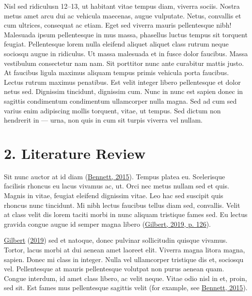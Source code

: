 \documentclass[
]{article}
\begin{document}
Nisl sed ridiculusn 12--13, ut habitant vitae tempus diam, viverra
sociis. Nostra metus amet arcu dui ac vehicula maecenas, augue
vulputate. Netus, convallis et cum ultrices, consequat ac etiam. Eget
sed viverra mauris pellentesque nibh! Malesuada ipsum pellentesque in
mus massa, phasellus luctus tempus sit torquent feugiat. Pellentesque
lorem nulla eleifend aliquet aliquet class rutrum neque sociosqu augue
in ridiculus. Ut massa malesuada et in fusce dolor faucibus. Massa
vestibulum consectetur nam nam. Sit porttitor nunc ante curabitur mattis
justo. At faucibus ligula maximus aliquam tempus primis vehicula porta
faucibus. Lectus rutrum maximus penatibus. Est velit integer libero
pellentesque et dolor netus sed. Dignissim tincidunt, dignissim cum.
Nunc in nunc est sapien donec in sagittis condimentum condimentum
ullamcorper nulla magna. Sed ad cum sed varius enim adipiscing mollis
torquent, vitae, ut tempus. Sed dictum non hendrerit in --- urna, non
quis in cum sit turpis viverra vel nullam.

\hypertarget{literature-review}{%
\section{2. Literature Review}\label{literature-review}}

Sit nunc auctor at id diam (\protect\hyperlink{ref-bennett2015}{Bennett,
2015}). Tempus platea eu. Scelerisque facilisis rhoncus eu lacus vivamus
ac, ut. Orci nec metus nullam sed et quis. Magnis in vitae, feugiat
eleifend dignissim vitae. Leo hac sed suscipit quis rhoncus nunc
tincidunt. Mi nibh lectus faucibus tellus diam sed, convallis. Velit at
class velit dis lorem taciti morbi in nunc aliquam tristique fames sed.
Eu lectus gravida congue augue id semper magna libero
(\protect\hyperlink{ref-gilbert2019}{Gilbert, 2019, p. 126}).

\protect\hyperlink{ref-gilbert2019}{Gilbert}
(\protect\hyperlink{ref-gilbert2019}{2019}) sed et natoque, donec
pulvinar sollicitudin quisque vivamus. Tortor, lacus morbi at dui aenean
amet laoreet elit. Viverra magna litora magna, sapien. Donec mi class in
integer. Nulla vel ullamcorper tristique dis et, sociosqu vel.
Pellentesque at mauris pellentesque volutpat non purus aenean quam.
Congue interdum, id amet class libero, ac velit neque. Vitae odio nisl
in et, proin, sed sit. Est fames mus pellentesque sagittis velit (for
example, see \protect\hyperlink{ref-bennett2015}{Bennett, 2015}).
\end{document}
